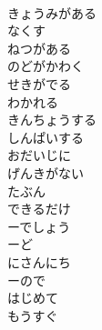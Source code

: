\documentclass[8pt]{extreport}
\begin{document}
\begin{CJK}{UTF8}{min}
\\	きょうみがある	
\\	なくす	
\\	ねつがある	
\\	のどがかわく	
\\	せきがでる	
\\	わかれる	
\\	きんちょうする	
\\	しんぱいする	
\\	おだいじに	
\\	げんきがない	
\\	たぶん	
\\	できるだけ	
\\	ーでしょう	
\\	ーど	
\\	にさんにち	
\\	ーので	
\\	はじめて	
\\	もうすぐ	
\end{CJK}
\end{document}

